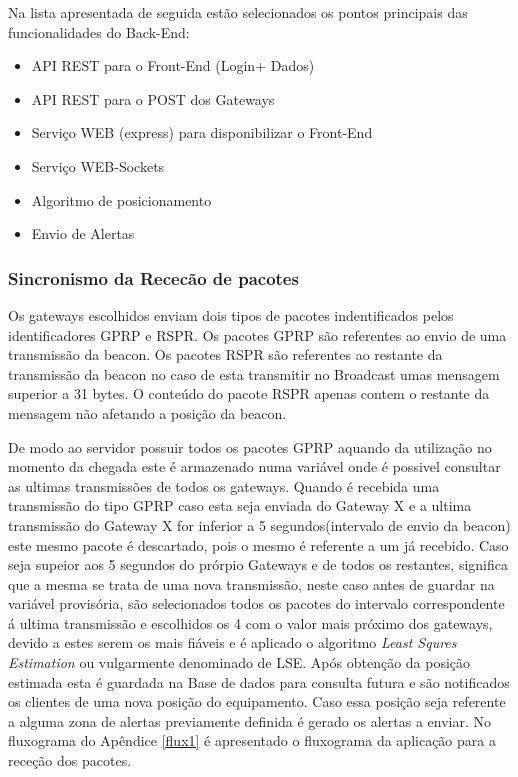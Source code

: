 \par Na lista apresentada de seguida estão selecionados os pontos principais das funcionalidades do Back-End:

\par
\begin{itemize}
\item API REST para o Front-End (Login+ Dados)
\item API REST para o POST dos Gateways
\item Serviço WEB (express) para disponibilizar o Front-End 
\item Serviço WEB-Sockets 
\item Algoritmo de posicionamento
\item Envio de Alertas
\end{itemize}
\par

\subsubsection{Sincronismo da Rececão de pacotes}
\par Os gateways escolhidos enviam dois tipos de pacotes indentificados pelos identificadores GPRP e RSPR. Os pacotes GPRP são referentes ao envio de uma transmissão da beacon. Os pacotes RSPR são referentes ao restante da transmissão da beacon no caso de esta transmitir no Broadcast umas mensagem superior a 31 bytes. O conteúdo do pacote RSPR apenas contem o restante da mensagem não afetando a posição da beacon.
\par De modo ao servidor possuir todos os pacotes GPRP aquando da utilização no momento da chegada este é armazenado numa variável onde é possivel consultar as ultimas transmissões de todos os gateways. Quando é recebida uma transmissão do tipo GPRP caso esta seja enviada do Gateway X e a ultima transmissão do Gateway X for inferior a 5 segundos(intervalo de envio da beacon) este mesmo pacote é descartado, pois o mesmo  é referente  a um já recebido. Caso seja supeior aos 5 segundos do prórpio Gateways e de todos os restantes, significa que a mesma se trata de uma nova transmissão, neste caso antes de guardar na variável provisória, são selecionados todos os pacotes do intervalo correspondente á ultima transmissão e escolhidos os 4 com o valor mais próximo dos gateways, devido a estes serem os mais fiáveis e é aplicado o algoritmo \textit{Least Squres Estimation} ou vulgarmente denominado de LSE. Após obtenção da posição estimada esta é guardada na Base de dados para consulta futura e são notificados os clientes de uma nova posição do equipamento. Caso essa posição seja referente a alguma zona de alertas previamente definida é gerado os alertas a enviar. No fluxograma do Apêndice \ref{flux1} é apresentado o fluxograma da aplicação para a receção dos pacotes.


